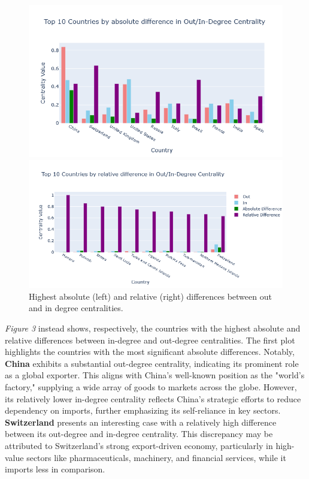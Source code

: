 \documentclass[12pt, a4paper]{article}
\begin{document}
\begin{figure}[!ht]
\centering
\begin{minipage}[b]{0.45\textwidth}
    \centering
    \includegraphics[width=\textwidth]{figures/question1/figure_3c.png}
\end{minipage}
\hfill
\begin{minipage}[b]{0.535\textwidth}
    \centering
    \includegraphics[width=\textwidth]{figures/question1/figure_3d.png}
\end{minipage}
\captionsetup{font=scriptsize,labelfont=bf}
\caption{Highest absolute (left) and relative (right) differences between out and in degree centralities.}
\label{fig:figure3}
\end{figure}

\textit{Figure 3} instead shows, respectively, the countries with the highest absolute and relative differences between in-degree and out-degree centralities. The first plot highlights the countries with the most significant absolute differences. Notably, \textbf{China} exhibits a substantial out-degree centrality, indicating its prominent role as a global exporter. This aligns with China's well-known position as the "world's factory," supplying a wide array of goods to markets across the globe. However, its relatively lower in-degree centrality reflects China's strategic efforts to reduce dependency on imports, further emphasizing its self-reliance in key sectors. \textbf{Switzerland} presents an interesting case with a relatively high difference between its out-degree and in-degree centrality. This discrepancy may be attributed to Switzerland's strong export-driven economy, particularly in high-value sectors like pharmaceuticals, machinery, and financial services, while it imports less in comparison.\\
\end{document}
